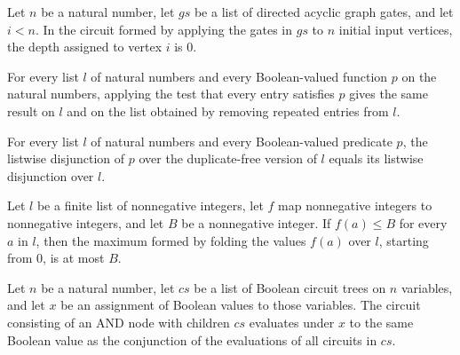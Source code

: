 \begin{theorem}
\label{BoolCircuit.vertexDepth_input}
\leanok
{}
Let $n$ be a natural number, let $gs$ be a list of directed acyclic graph gates, and let
$i<n$. In the circuit formed by applying the gates in $gs$ to $n$ initial input
vertices, the depth assigned to vertex $i$ is $0$.
\end{theorem}

\begin{theorem}
\label{BoolCircuit.all_dedup}
\leanok
{}
For every list $l$ of natural numbers and every Boolean-valued function $p$ on the
natural numbers, applying the test that every entry satisfies $p$ gives the same result
on $l$ and on the list obtained by removing repeated entries from $l$.
\end{theorem}

\begin{theorem}
\label{BoolCircuit.any_dedup}
\leanok
{}
For every list $l$ of natural numbers and every Boolean-valued predicate $p$, the
listwise disjunction of $p$ over the duplicate-free version of $l$ equals its listwise
disjunction over $l$.
\end{theorem}

\begin{theorem}
\label{BoolCircuit.foldr_max_le}
\leanok
{}
Let $l$ be a finite list of nonnegative integers, let $f$ map nonnegative integers to
nonnegative integers, and let $B$ be a nonnegative integer. If $f(a)\le B$ for every $a$
in $l$, then the maximum formed by folding the values $f(a)$ over $l$, starting from
$0$, is at most $B$.
\end{theorem}

\begin{theorem}
\label{BoolCircuit.TreeCircuit.eval_node_true}
\leanok
{}
Let $n$ be a natural number, let $cs$ be a list of Boolean circuit trees on $n$
variables, and let $x$ be an assignment of Boolean values to those variables. The
circuit consisting of an AND node with children $cs$ evaluates under $x$ to the same
Boolean value as the conjunction of the evaluations of all circuits in $cs$.
\end{theorem}

